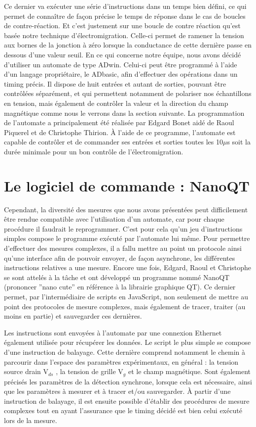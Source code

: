 Ce dernier va exécuter une série d’instructions dans un temps bien défini, ce qui permet de connaître de façon précise le temps de réponse dans le cas de boucles de contre-réaction. Et c’est justement sur une boucle de contre réaction qu’est basée notre technique d’électromigration. Celle-ci permet de ramener la tension aux bornes de la jonction à zéro lorsque la conductance de cette dernière passe en dessous d’une valeur seuil. En ce qui concerne notre équipe, nous avons décidé d’utiliser un automate de type ADwin. Celui-ci peut être programmé à l’aide d’un langage propriétaire, le ADbasic, afin d’effectuer des opérations dans un timing précis. Il dispose de huit entrées et autant de sorties, pouvant être contrôlées séparément, et qui permettent notamment de polariser nos échantillons en tension, mais également de contrôler la valeur et la direction du champ magnétique comme nous le verrons dans la section suivante. La programmation de l’automate a principalement été réalisée par Edgard Bonet aidé de Raoul Piquerel et de Christophe Thirion. À l’aide de ce programme, l’automate est capable de contrôler et de commander ses entrées et sorties toutes les 10$\mu$s soit la durée minimale pour un bon contrôle de l’électromigration.

\section{Le logiciel de commande : NanoQT}
Cependant, la diversité des mesures que nous avons présentées peut difficilement être rendue compatible avec l’utilisation d’un automate, car pour chaque procédure il faudrait le reprogrammer. C’est pour cela qu’un jeu d’instructions simples compose le programme exécuté par l’automate lui même. Pour permettre d’effectuer des mesures complexes, il a fallu mettre au point un protocole ainsi qu’une interface afin de pouvoir envoyer, de façon asynchrone, les différentes instructions relatives a une mesure. Encore une fois, Edgard, Raoul et Christophe se sont attelés à la tâche et ont développé un programme nommé NanoQT (prononcer ”nano cute” en référence à la librairie graphique QT). Ce dernier permet, par l’intermédiaire de scripts en JavaScript, non seulement de mettre au point des protocoles de mesure complexes, mais également de tracer, traiter (au moins en partie) et sauvegarder ces dernières.


Les instructions sont envoyées à l’automate par une connexion Ethernet également utilisée pour récupérer les données. Le script le plus simple se compose d’une instruction de balayage. Cette dernière comprend notamment le
chemin à parcourir dans l’espace des paramètres expérimentaux, en général : la tension source drain V$_{ds}$ , la tension de grille V$_g$ et le champ magnétique. Sont également précisés les paramètres de la détection synchrone, lorsque cela est nécessaire, ainsi que les paramètres à mesurer et à tracer et/ou sauvegarder. À partir d’une instruction de balayage, il est ensuite possible d’établir des procédures de mesure complexes tout en ayant l’assurance que le timing décidé est bien celui exécuté lors de la mesure.

